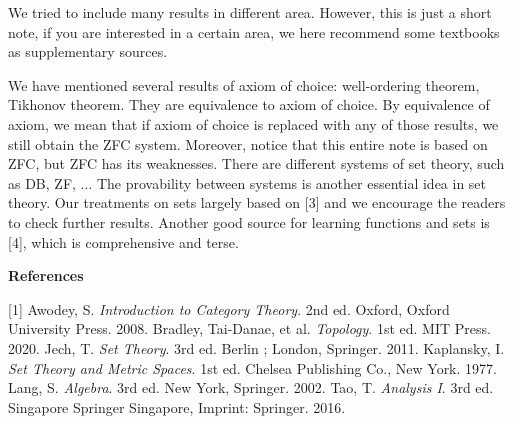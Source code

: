 \documentclass[10pt]{article}
\begin{document}
We tried to include many results in different area. However, this is just a short note, if you are interested in a certain area, we here recommend some textbooks as supplementary sources.
\par
We have mentioned several results of axiom of choice: well-ordering theorem, Tikhonov theorem. They are equivalence to axiom of choice. By equivalence of axiom, we mean that if axiom of choice is replaced with any of those results, we still obtain the ZFC system. Moreover, notice that this entire note is based on ZFC, but ZFC has its weaknesses. There are different systems of set theory, such as DB, ZF, $\dots$ The provability between systems is another essential idea in set theory. Our treatments on sets largely based on [3] and we encourage the readers to check further results. Another good source for learning functions and sets is [4], which is comprehensive and terse. 
\par

\par


\vspace{\baselineskip}
\begin{center}
    \large\bfseries References\normalsize
\end{center}
[1] Awodey, S. \textit{Introduction to Category Theory}. 2nd ed. Oxford, Oxford University Press. 2008.
\newline
[2] Bradley, Tai-Danae, et al. \textit{Topology}. 1st ed. MIT Press. 2020.
\newline
[3] Jech, T. \textit{Set Theory}. 3rd ed. Berlin ; London, Springer. 2011.
\newline
[4] Kaplansky, I. \textit{Set Theory and Metric Spaces}. 1st ed. Chelsea Publishing Co., New York. 1977.
\newline
[5] Lang, S. \textit{Algebra}. 3rd ed. New York, Springer. 2002.
\newline
[6] Tao, T. \textit{Analysis I}. 3rd ed. Singapore Springer Singapore, Imprint: Springer. 2016.
\hindex 
\end{document}
